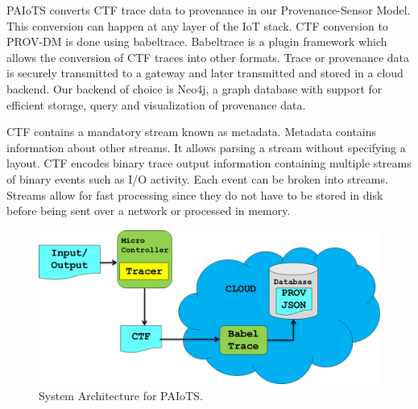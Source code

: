 
PAIoTS converts CTF trace data to provenance in our Provenance-Sensor Model. This conversion can happen at any layer of the IoT stack. CTF conversion to PROV-DM is done using babeltrace. Babeltrace is a plugin framework which allows the conversion of CTF traces into other formats. Trace or provenance data is securely transmitted to a gateway and later transmitted and stored in a cloud backend. Our backend of choice is Neo4j, a graph database with support for efficient storage, query and visualization of provenance data. 

\par CTF contains a mandatory stream known as metadata. Metadata contains information about other streams. It allows parsing a stream without specifying a layout. CTF encodes binary trace output information containing multiple streams of binary events such as I/O activity. Each event can be broken into streams. Streams allow for fast processing since they do not have to be stored in disk before being sent over a network or processed in memory.





\begin{figure}[h!]
\begin{center}

\includegraphics[width=\textwidth]{system_architecture.png}    
\end{center}
\caption{System Architecture for PAIoTS.}
\label{architecture}
\end{figure}

